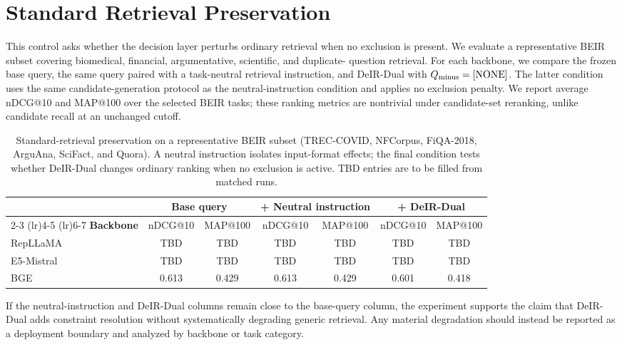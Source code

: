 \documentclass[letterpaper]{article}
\newcommand{\method}{DeIR-Dual}
\newcommand{\qminus}{Q_{\text{minus}}}
\begin{document}
\section{Standard Retrieval Preservation}
\label{app:standard-retrieval}

This control asks whether the decision layer perturbs ordinary retrieval
when no exclusion is present.  We evaluate a representative BEIR subset
covering biomedical, financial, argumentative, scientific, and duplicate-
question retrieval.  For each backbone, we compare the frozen base query,
the same query paired with a task-neutral retrieval instruction, and
\method{} with $\qminus=\textnormal{[NONE]}$.  The latter condition uses
the same candidate-generation protocol as the neutral-instruction
condition and applies no exclusion penalty.  We report average nDCG@10
and MAP@100 over the selected BEIR tasks; these ranking metrics are
nontrivial under candidate-set reranking, unlike candidate recall at an
unchanged cutoff.

\begin{table}[!t]
\centering
\small
\begin{tabular}{lcc|cc|cc}
\toprule
& \multicolumn{2}{c|}{Base query} &
\multicolumn{2}{c|}{+ Neutral instruction} &
\multicolumn{2}{c}{+ \method{}} \\
\cmidrule(lr){2-3} \cmidrule(lr){4-5} \cmidrule(lr){6-7}
\textbf{Backbone} & nDCG@10 & MAP@100 & nDCG@10 & MAP@100 & nDCG@10 & MAP@100 \\
\midrule
RepLLaMA & \textnormal{TBD} & \textnormal{TBD} & \textnormal{TBD} & \textnormal{TBD} & \textnormal{TBD} & \textnormal{TBD} \\
E5-Mistral & \textnormal{TBD} & \textnormal{TBD} & \textnormal{TBD} & \textnormal{TBD} & \textnormal{TBD} & \textnormal{TBD} \\
BGE & 0.613 & 0.429 & 0.613 & 0.429 & 0.601 & 0.418 \\
\bottomrule
\end{tabular}
\caption{Standard-retrieval preservation on a representative BEIR subset
(TREC-COVID, NFCorpus, FiQA-2018, ArguAna, SciFact, and Quora).  A
neutral instruction isolates input-format effects; the final condition
tests whether \method{} changes ordinary ranking when no exclusion is
active.  \textnormal{TBD} entries are to be filled from matched runs.}
\label{tab:standard-retrieval}
\end{table}

If the neutral-instruction and \method{} columns remain close to the
base-query column, the experiment supports the claim that DeIR-Dual adds
constraint resolution without systematically degrading generic retrieval.
Any material degradation should instead be reported as a deployment
boundary and analyzed by backbone or task category.
\end{document}
